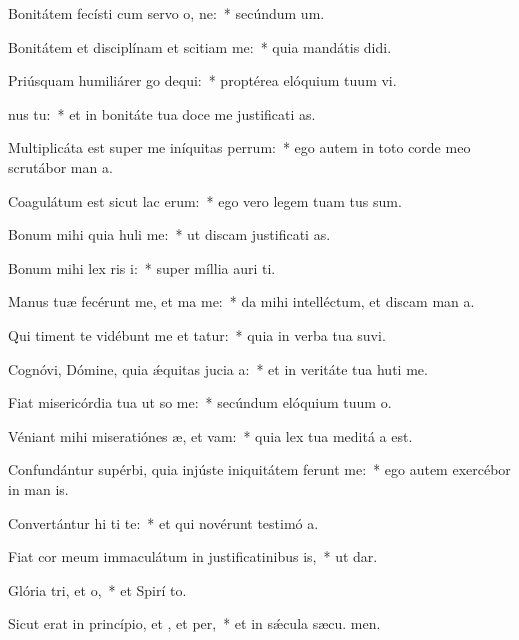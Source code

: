\item Bonitátem fecísti cum servo o, ne:~* secúndum  um.
\item Bonitátem et disciplínam et scitiam  me:~* quia mandátis  didi.
\item Priúsquam humiliárer go dequi:~* proptérea elóquium tuum vi.
\item {}nus  tu:~* et in bonitáte tua doce me justificati as.
\item Multiplicáta est super me iníquitas perrum:~* ego autem in toto corde meo scrutábor man a.
\item Coagulátum est sicut lac  erum:~* ego vero legem tuam tus sum.
\item Bonum mihi quia huli me:~* ut discam justificati as.
\item Bonum mihi lex ris i:~* super míllia auri  ti.
\item Manus tuæ fecérunt me, et ma me:~* da mihi intelléctum, et discam man a.
\item Qui timent te vidébunt me et tatur:~* quia in verba tua suvi.
\item Cognóvi, Dómine, quia ǽquitas jucia a:~* et in veritáte tua huti me.
\item Fiat misericórdia tua ut so me:~* secúndum elóquium tuum  o.
\item Véniant mihi miseratiónes æ, et vam:~* quia lex tua meditá a est.
\item Confundántur supérbi, quia injúste iniquitátem ferunt  me:~* ego autem exercébor in man is.
\item Convertántur hi ti te:~* et qui novérunt testimó a.
\item Fiat cor meum immaculátum in justificatinibus is,~* ut  dar.
\item Glória tri, et o,~* et Spirí to.
\item Sicut erat in princípio, et , et per,~* et in sǽcula sæcu. men.
